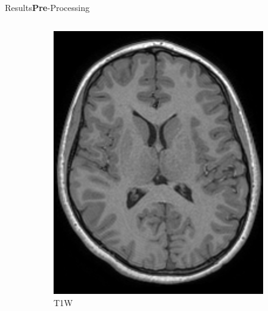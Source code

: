 \documentclass[]{standalone}
\begin{document}
\begin{frame}{Results}{\textbf{Pre}-Processing}
\begin{columns}
\begin{column}{0.65\textwidth}
\begin{figure}[h!]
\begin{subfigure}{0.3\textwidth}
					\includegraphics[scale=0.11]{./IMG/T1W48.png}
					\caption*{\tiny T1W }
				\end{subfigure}
				\hfill
				\begin{subfigure}{0.3\textwidth}

\end{subfigure}
\end{figure}
\end{column}
\end{columns}
\end{frame}
\end{document}
